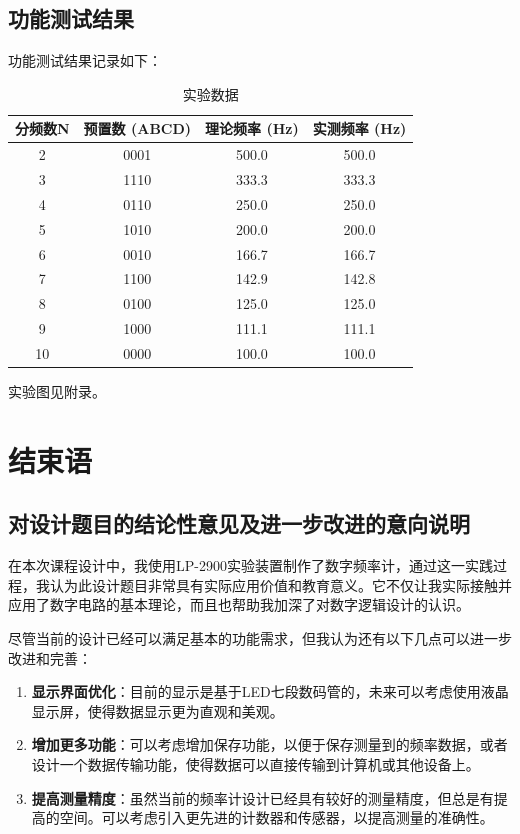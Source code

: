 \documentclass[UTF8,titlepage,a4paper]{ctexart}
\numberwithin{figure}{section}
\begin{document}
\subsection{功能测试结果}
功能测试结果记录如下：
\begin{table}[h]
    \centering
    \begin{tabular}{|c|c|c|c|}
    \hline
    分频数N & 预置数 (ABCD) & 理论频率 (Hz) & 实测频率 (Hz) \\
    \hline
    2 & 0001 & 500.0 & 500.0 \\
    3 & 1110 & 333.3 & 333.3 \\
    4 & 0110 & 250.0 & 250.0 \\
    5 & 1010 & 200.0 & 200.0 \\
    6 & 0010 & 166.7 & 166.7 \\
    7 & 1100 & 142.9 & 142.8 \\
    8 & 0100 & 125.0 & 125.0 \\
    9 & 1000 & 111.1 & 111.1 \\
    10 & 0000 & 100.0 & 100.0 \\
    \hline
    \end{tabular}
    \caption{实验数据}
\end{table}

实验图见附录。

\clearpage
\section{结束语}
\subsection{对设计题目的结论性意见及进一步改进的意向说明}
在本次课程设计中，我使用LP-2900实验装置制作了数字频率计，通过这一实践过程，我认为此设计题目非常具有实际应用价值和教育意义。它不仅让我实际接触并应用了数字电路的基本理论，而且也帮助我加深了对数字逻辑设计的认识。

尽管当前的设计已经可以满足基本的功能需求，但我认为还有以下几点可以进一步改进和完善：
\begin{enumerate}
    \item \textbf{显示界面优化}：目前的显示是基于LED七段数码管的，未来可以考虑使用液晶显示屏，使得数据显示更为直观和美观。
    \item \textbf{增加更多功能}：可以考虑增加保存功能，以便于保存测量到的频率数据，或者设计一个数据传输功能，使得数据可以直接传输到计算机或其他设备上。
    \item \textbf{提高测量精度}：虽然当前的频率计设计已经具有较好的测量精度，但总是有提高的空间。可以考虑引入更先进的计数器和传感器，以提高测量的准确性。
\end{enumerate}
\end{document}
